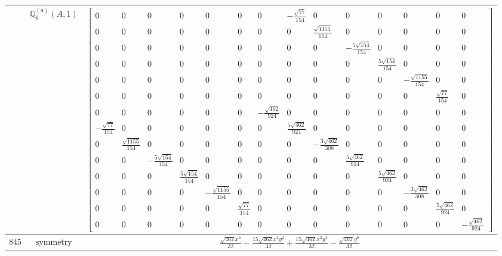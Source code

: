 \documentclass[fleqn,8pt,landscape]{jsarticle}
\begin{document}
\begin{longtable}{ccc}
$  $ & $ \mathbb{Q}_{6}^{(a)}(A,1) $ & $ \begin{bmatrix} 0 & 0 & 0 & 0 & 0 & 0 & 0 & - \frac{\sqrt{77}}{154} & 0 & 0 & 0 & 0 & 0 & 0 \\ 0 & 0 & 0 & 0 & 0 & 0 & 0 & 0 & \frac{\sqrt{1155}}{154} & 0 & 0 & 0 & 0 & 0 \\ 0 & 0 & 0 & 0 & 0 & 0 & 0 & 0 & 0 & - \frac{5 \sqrt{154}}{154} & 0 & 0 & 0 & 0 \\ 0 & 0 & 0 & 0 & 0 & 0 & 0 & 0 & 0 & 0 & \frac{5 \sqrt{154}}{154} & 0 & 0 & 0 \\ 0 & 0 & 0 & 0 & 0 & 0 & 0 & 0 & 0 & 0 & 0 & - \frac{\sqrt{1155}}{154} & 0 & 0 \\ 0 & 0 & 0 & 0 & 0 & 0 & 0 & 0 & 0 & 0 & 0 & 0 & \frac{\sqrt{77}}{154} & 0 \\ 0 & 0 & 0 & 0 & 0 & 0 & - \frac{\sqrt{462}}{924} & 0 & 0 & 0 & 0 & 0 & 0 & 0 \\ - \frac{\sqrt{77}}{154} & 0 & 0 & 0 & 0 & 0 & 0 & \frac{5 \sqrt{462}}{924} & 0 & 0 & 0 & 0 & 0 & 0 \\ 0 & \frac{\sqrt{1155}}{154} & 0 & 0 & 0 & 0 & 0 & 0 & - \frac{3 \sqrt{462}}{308} & 0 & 0 & 0 & 0 & 0 \\ 0 & 0 & - \frac{5 \sqrt{154}}{154} & 0 & 0 & 0 & 0 & 0 & 0 & \frac{5 \sqrt{462}}{924} & 0 & 0 & 0 & 0 \\ 0 & 0 & 0 & \frac{5 \sqrt{154}}{154} & 0 & 0 & 0 & 0 & 0 & 0 & \frac{5 \sqrt{462}}{924} & 0 & 0 & 0 \\ 0 & 0 & 0 & 0 & - \frac{\sqrt{1155}}{154} & 0 & 0 & 0 & 0 & 0 & 0 & - \frac{3 \sqrt{462}}{308} & 0 & 0 \\ 0 & 0 & 0 & 0 & 0 & \frac{\sqrt{77}}{154} & 0 & 0 & 0 & 0 & 0 & 0 & \frac{5 \sqrt{462}}{924} & 0 \\ 0 & 0 & 0 & 0 & 0 & 0 & 0 & 0 & 0 & 0 & 0 & 0 & 0 & - \frac{\sqrt{462}}{924} \end{bmatrix} $ \\ \hline
$ 845 $ & $ \text{symmetry} $ & $ \frac{\sqrt{462} x^{6}}{32} - \frac{15 \sqrt{462} x^{4} y^{2}}{32} + \frac{15 \sqrt{462} x^{2} y^{4}}{32} - \frac{\sqrt{462} y^{6}}{32} $ \\

\end{longtable}
\end{document}
